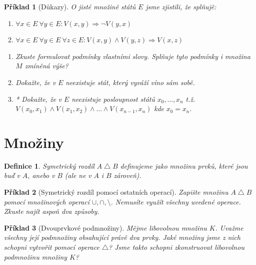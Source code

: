 \documentclass[10pt]{article}
\theoremstyle{definitionstyle}
\newtheorem{defn}{Definice}
\theoremstyle{problemstyle}
\newtheorem{problem}{Příklad}
\begin{document}
\begin{problem}[Důkazy]
O jisté množině států $E$ jsme zjistili, že splňujě:
\begin{enumerate}
    \item $\forall x \in E \ \forall y \in E: V(x,y) \Rightarrow \neg V(y,x)$
    \item $\forall x \in E \ \forall y \in E \  \forall z \in E : V(x,y) \wedge V(y,z) \Rightarrow V(x,z)$
\end{enumerate} 
\begin{enumerate}[label=(\alph*)]
    \item Zkuste formulovat podmínky vlastními slovy. Splňuje tyto podmínky i množina $M$ zmíněná výše?
    \item Dokažte, že v $E$ neexistuje stát, který vyváží víno sám sobě. 
    \item* Dokažte, že v $E$ neexistuje posloupnost států $x_0, \ldots , x_n$ t.ž. $V(x_0,x_1) \wedge V(x_1,x_2) \wedge \ldots \wedge  V(x_{n-1},x_n)$ kde $x_0 = x_n$.

\end{enumerate}

\end{problem}

\section{Množiny}

\begin{defn}
    Symetrický rozdíl $A \bigtriangleup B$ definujeme jako množinu prvků, které jsou buď v $A$, anebo v $B$ (ale ne v $A$ i $B$ zároveň).
\end{defn}

\begin{problem}[Symetrický rozdíl pomocí ostatních operací]
Zapište množinu $A \bigtriangleup B$ pomocí množinových operací $\cup, \cap, \setminus$. Nemusíte využít všechny uvedené operace. Zkuste najít aspoň dva způsoby.
\end{problem}

\begin{problem}[Dvouprvkové podmnožiny]
Mějme libovolnou množinu $K$. Uvažme všechny její podmnožiny obsahující právě dva prvky. Jaké množiny jsme z nich schopni vytvořit pomocí operace $\bigtriangleup$? Jsme takto schopni zkonstruovat libovolnou podmnožinu množiny $K$?
\end{problem}
\end{document}
